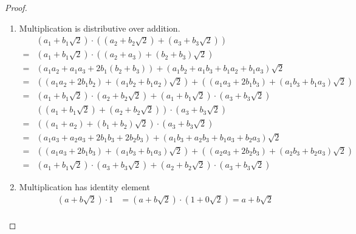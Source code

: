 \begin{proof}
\begin{enumerate}[label = (\arabic*)]
        \item Multiplication is distributive over addition.
              \begin{align*}
                    & (a_{1} + b_{1}\sqrt{2})\cdot \left((a_{2} + b_{2}\sqrt{2}) + (a_{3} + b_{3}\sqrt{2})\right)                                                               \\
                  = & (a_{1} + b_{1}\sqrt{2})\cdot\left((a_{2} + a_{3}) + (b_{2} + b_{3})\sqrt{2}\right)                                                                        \\
                  = & (a_{1}a_{2} + a_{1}a_{3} + 2b_{1}(b_{2} + b_{3})) + (a_{1}b_{2} + a_{1}b_{3} + b_{1}a_{2} + b_{1}a_{3})\sqrt{2}                                           \\
                  = & \left((a_{1}a_{2} + 2b_{1}b_{2}) + (a_{1}b_{2} + b_{1}a_{2})\sqrt{2}\right) + \left((a_{1}a_{3} + 2b_{1}b_{3}) + (a_{1}b_{3} + b_{1}a_{3})\sqrt{2}\right) \\
                  = & (a_{1} + b_{1}\sqrt{2})\cdot (a_{2} + b_{2}\sqrt{2}) + (a_{1} + b_{1}\sqrt{2})\cdot (a_{3} + b_{3}\sqrt{2})
              \end{align*}
              \begin{align*}
                    & \left((a_{1} + b_{1}\sqrt{2}) + (a_{2} + b_{2}\sqrt{2})\right)\cdot (a_{3} + b_{3}\sqrt{2})                                                               \\
                  = & \left((a_{1} + a_{2}) + (b_{1} + b_{2})\sqrt{2}\right)\cdot (a_{3} + b_{3}\sqrt{2})                                                                       \\
                  = & \left(a_{1}a_{3} + a_{2}a_{3} + 2b_{1}b_{3} + 2b_{2}b_{3}\right) + (a_{1}b_{3} + a_{2}b_{3} + b_{1}a_{3} + b_{2}a_{3})\sqrt{2}                            \\
                  = & \left((a_{1}a_{3} + 2b_{1}b_{3}) + (a_{1}b_{3} + b_{1}a_{3})\sqrt{2}\right) + \left((a_{2}a_{3} + 2b_{2}b_{3}) + (a_{2}b_{3} + b_{2}a_{3})\sqrt{2}\right) \\
                  = & (a_{1} + b_{1}\sqrt{2})\cdot (a_{3} + b_{3}\sqrt{2}) + (a_{2} + b_{2}\sqrt{2})\cdot (a_{3} + b_{3}\sqrt{2})
              \end{align*}
        \item Multiplication has identity element
              \begin{align*}
                  (a + b\sqrt{2})\cdot 1 & = (a + b\sqrt{2})\cdot (1 + 0\sqrt{2}) = a + b\sqrt{2} \\

\end{align*}
\end{enumerate}
\end{proof}
